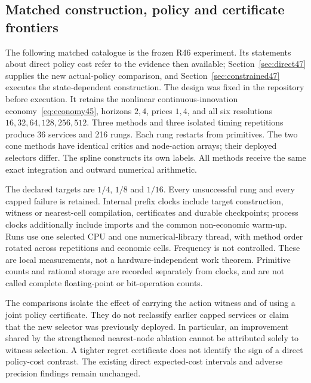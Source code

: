 \subsection{Matched construction, policy and certificate frontiers}\label{sec:study46}
The following matched catalogue is the frozen R46 experiment. Its statements about direct policy cost refer to the evidence then available; Section~\ref{sec:direct47} supplies the new actual-policy comparison, and Section~\ref{sec:constrained47} executes the state-dependent construction. The design was fixed in the repository before execution. It retains the nonlinear continuous-innovation economy~\eqref{eq:economy45}, horizons $2,4$, prices $1,4$, and all six resolutions $16,32,64,128,256,512$. Three methods and three isolated timing repetitions produce 36 services and 216 rungs. Each rung restarts from primitives. The two cone methods have identical critics and node-action arrays; their deployed selectors differ. The spline constructs its own labels. All methods receive the same exact integration and outward numerical arithmetic.

The declared targets are $1/4$, $1/8$ and $1/16$. Every unsuccessful rung and every capped failure is retained. Internal prefix clocks include target construction, witness or nearest-cell compilation, certificates and durable checkpoints; process clocks additionally include imports and the common non-economic warm-up. Runs use one selected CPU and one numerical-library thread, with method order rotated across repetitions and economic cells. Frequency is not controlled. These are local measurements, not a hardware-independent work theorem. Primitive counts and rational storage are recorded separately from clocks, and are not called complete floating-point or bit-operation counts.



The comparisons isolate the effect of carrying the action witness and of using a joint policy certificate. They do not reclassify earlier capped services or claim that the new selector was previously deployed. In particular, an improvement shared by the strengthened nearest-node ablation cannot be attributed solely to witness selection. A tighter regret certificate does not identify the sign of a direct policy-cost contrast. The existing direct expected-cost intervals and adverse precision findings remain unchanged.
